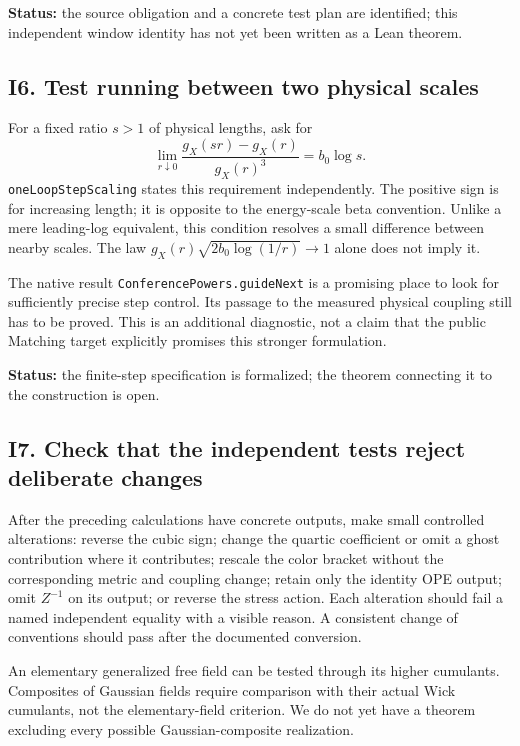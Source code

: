 \documentclass[11pt]{article}
\newcommand{\code}[1]{{\small\nolinkurl{#1}}}
\begin{document}
\textbf{Status:} the source obligation and a concrete test plan are
identified; this independent window identity has not yet been
written as a Lean theorem.

\subsection{I6. Test running between two physical scales}

For a fixed ratio $s>1$ of physical lengths, ask for
\[
 \lim_{r\downarrow0}
 \frac{g_X(sr)-g_X(r)}{g_X(r)^3}=b_0\log s.
\]
\code{oneLoopStepScaling} states this requirement independently.
The positive sign is for increasing length; it is opposite to
the energy-scale beta convention. Unlike a mere leading-log
equivalent, this condition resolves a small difference between
nearby scales. The law
$g_X(r)\sqrt{2b_0\log(1/r)}\to1$ alone does not imply it.

The native result \code{ConferencePowers.guideNext} is a promising
place to look for sufficiently precise step control. Its passage
to the measured physical coupling still has to be proved.
This is an additional diagnostic, not a claim that the public
Matching target explicitly promises this stronger formulation.

\textbf{Status:} the finite-step specification is formalized;
the theorem connecting it to the construction is open.

\subsection{I7. Check that the independent tests reject deliberate changes}

After the preceding calculations have concrete outputs, make
small controlled alterations: reverse the cubic sign; change the
quartic coefficient or omit a ghost contribution where it contributes;
rescale the color bracket without the corresponding metric and
coupling change; retain only the identity OPE output; omit
$Z^{-1}$ on its output; or reverse the stress action. Each
alteration should fail a named independent equality with a
visible reason. A consistent change of conventions should pass
after the documented conversion.

An elementary generalized free field can be tested through its
higher cumulants. Composites of Gaussian fields require comparison
with their actual Wick cumulants, not the elementary-field
criterion. We do not yet have a theorem excluding every possible
Gaussian-composite realization.
\end{document}
